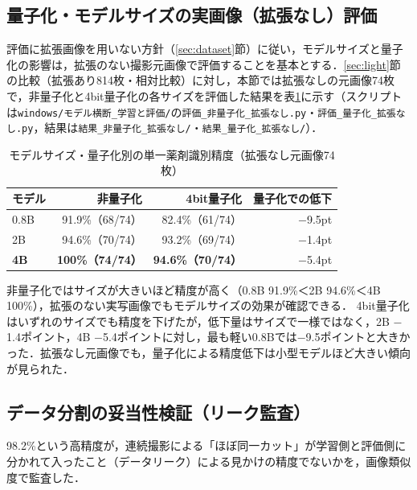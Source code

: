 \documentclass[dvipdfmx]{jsarticle}
\begin{document}
\subsection{量子化・モデルサイズの実画像（拡張なし）評価}\label{sec:quant_real}

評価に拡張画像を用いない方針（\ref{sec:dataset}節）に従い，モデルサイズと量子化の影響は，拡張のない撮影元画像で評価することを基本とする．\ref{sec:light}節の比較（拡張あり814枚・相対比較）に対し，本節では拡張なしの元画像74枚で，非量子化と4bit量子化の各サイズを評価した結果を表\ref{tab:quant_real}に示す（スクリプトは\texttt{windows/モデル横断\_学習と評価/}の\texttt{評価\_非量子化\_拡張なし.py}・\texttt{評価\_量子化\_拡張なし.py}，結果は\texttt{結果\_非量子化\_拡張なし/}・\texttt{結果\_量子化\_拡張なし/}）．

\begin{table}[htbp]
\centering
\caption{モデルサイズ・量子化別の単一薬剤識別精度（拡張なし元画像74枚）}
\label{tab:quant_real}
\begin{tabular}{lrrr}
\hline
モデル & 非量子化 & 4bit量子化 & 量子化での低下 \\
\hline
0.8B & 91.9\%（68/74） & 82.4\%（61/74） & $-$9.5pt \\
2B & 94.6\%（70/74） & 93.2\%（69/74） & $-$1.4pt \\
\textbf{4B} & \textbf{100\%（74/74）} & \textbf{94.6\%（70/74）} & $-$5.4pt \\
\hline
\end{tabular}
\end{table}

非量子化ではサイズが大きいほど精度が高く（0.8B 91.9\%＜2B 94.6\%＜4B 100\%），拡張のない実写画像でもモデルサイズの効果が確認できる．
4bit量子化はいずれのサイズでも精度を下げたが，低下量はサイズで一様ではなく，2B $-$1.4ポイント，4B $-$5.4ポイントに対し，最も軽い0.8Bでは$-$9.5ポイントと大きかった．拡張なし元画像でも，量子化による精度低下は小型モデルほど大きい傾向が見られた．

\subsection{データ分割の妥当性検証（リーク監査）}\label{sec:leak}

98.2\%という高精度が，連続撮影による「ほぼ同一カット」が学習側と評価側に分かれて入ったこと（データリーク）による見かけの精度でないかを，画像類似度で監査した．
\end{document}
